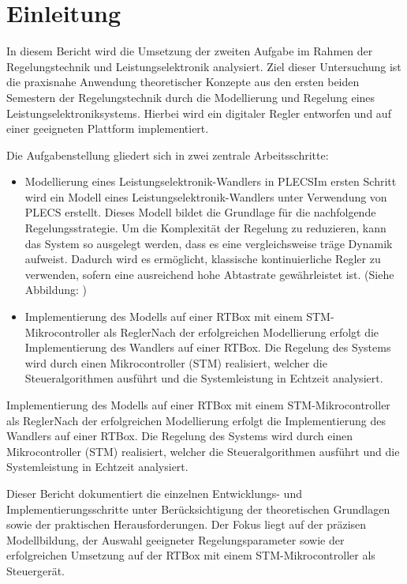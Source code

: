\section{Einleitung} \label{sec:einleitung}


In diesem Bericht wird die Umsetzung der zweiten Aufgabe im Rahmen der Regelungstechnik und Leistungselektronik analysiert. Ziel dieser Untersuchung ist die praxisnahe Anwendung theoretischer Konzepte aus den ersten beiden Semestern der Regelungstechnik durch die Modellierung und Regelung eines Leistungselektroniksystems. Hierbei wird ein digitaler Regler entworfen und auf einer geeigneten Plattform implementiert.

Die Aufgabenstellung gliedert sich in zwei zentrale Arbeitsschritte:
\begin{itemize}
    \item Modellierung eines Leistungselektronik-Wandlers in PLECSIm ersten Schritt wird ein Modell eines Leistungselektronik-Wandlers unter Verwendung von PLECS erstellt. Dieses Modell bildet die Grundlage für die nachfolgende Regelungsstrategie. Um die Komplexität der Regelung zu reduzieren, kann das System so ausgelegt werden, dass es eine vergleichsweise träge Dynamik aufweist. Dadurch wird es ermöglicht, klassische kontinuierliche Regler zu verwenden, sofern eine ausreichend hohe Abtastrate gewährleistet ist. (Siehe Abbildung: \label{fig:Soft})

    \item Implementierung des Modells auf einer RTBox mit einem STM-Mikrocontroller als ReglerNach der erfolgreichen Modellierung erfolgt die Implementierung des Wandlers auf einer RTBox. Die Regelung des Systems wird durch einen Mikrocontroller (STM) realisiert, welcher die Steueralgorithmen ausführt und die Systemleistung in Echtzeit analysiert.
\end{itemize}


Implementierung des Modells auf einer RTBox mit einem STM-Mikrocontroller als ReglerNach der erfolgreichen Modellierung erfolgt die Implementierung des Wandlers auf einer RTBox. Die Regelung des Systems wird durch einen Mikrocontroller (STM) realisiert, welcher die Steueralgorithmen ausführt und die Systemleistung in Echtzeit analysiert.

Dieser Bericht dokumentiert die einzelnen Entwicklungs- und Implementierungsschritte unter Berücksichtigung der theoretischen Grundlagen sowie der praktischen Herausforderungen. Der Fokus liegt auf der präzisen Modellbildung, der Auswahl geeigneter Regelungsparameter sowie der erfolgreichen Umsetzung auf der RTBox mit einem STM-Mikrocontroller als Steuergerät.